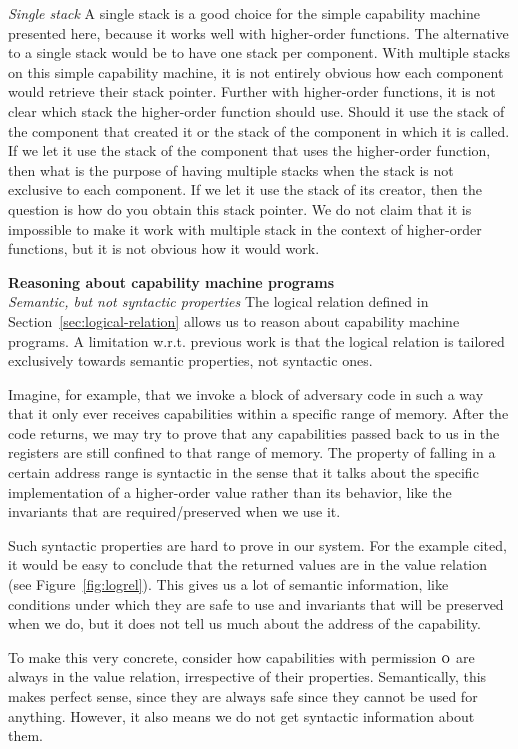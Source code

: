\documentclass[acmsmall,review]{acmart}\settopmatter{printfolios=true}
\newcommand{\plainperm}[1]{\textsc{#1}}
\newcommand{\noperm}{\plainperm{o}}
\begin{document}
\emph{Single stack} A single stack is a good choice for the simple capability
machine presented here, because it works well with higher-order functions. The
alternative to a single stack would be to have one stack per component. With
multiple stacks on this simple capability machine, it is not entirely obvious
how each component would retrieve their stack pointer. Further with higher-order
functions, it is not clear which stack the higher-order function should
use. Should it use the stack of the component that created it or the stack of
the component in which it is called. If we let it use the stack of the component
that uses the higher-order function, then what is the purpose of having multiple
stacks when the stack is not exclusive to each component. If we let it use the
stack of its creator, then the question is how do you obtain this stack
pointer. We do not claim that it is impossible to make it work with multiple
stack in the context of higher-order functions, but it is not obvious how it
would work.

\noindent \textbf{Reasoning about capability machine programs}\\
\emph{Semantic, but not syntactic properties} The logical relation defined in
Section~\ref{sec:logical-relation} allows us to reason about capability machine
programs. A limitation w.r.t. previous work is that the logical relation is
tailored exclusively towards semantic properties, not syntactic ones.

Imagine, for example, that we invoke a block of adversary code in such a way
that it only ever receives capabilities within a specific range of memory. After
the code returns, we may try to prove that any capabilities passed back to us in
the registers are still confined to that range of memory. The property of
falling in a certain address range is syntactic in the sense that it talks about
the specific implementation of a higher-order value rather than its behavior,
like the invariants that are required/preserved when we use it.

Such syntactic properties are hard to prove in our system. For the example
cited, it would be easy to conclude that the returned values are in the value
relation (see Figure~\ref{fig:logrel}). This gives us a lot of semantic
information, like conditions under which they are safe to use and invariants
that will be preserved when we do, but it does not tell us much about the
address of the capability.

To make this very concrete, consider how capabilities with permission $\noperm$
are always in the value relation, irrespective of their properties.
Semantically, this makes perfect sense, since they are always safe since they
cannot be used for anything. However, it also means we do not get syntactic
information about them.
\end{document}
